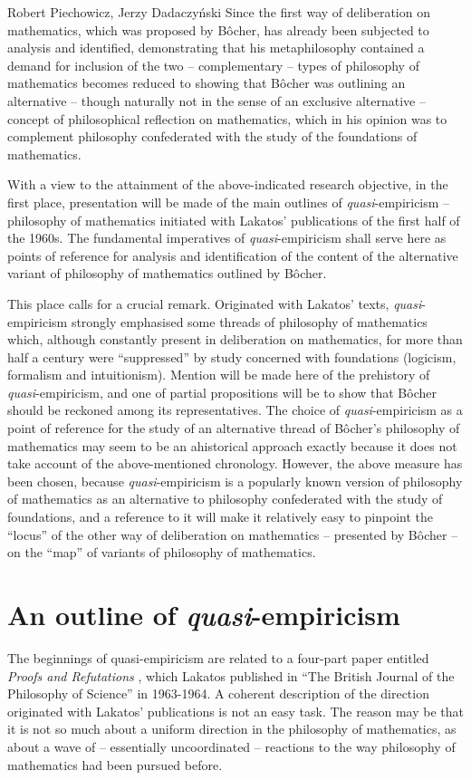 \begin{artengenv}{Robert Piechowicz, Jerzy Dadaczyński}
Since the first way of deliberation on mathematics, which was proposed by Bôcher, has already been subjected to analysis and identified, demonstrating that his metaphilosophy contained a demand for inclusion of the two -- complementary -- types of philosophy of mathematics becomes reduced to showing that Bôcher was outlining an alternative -- though naturally not in the sense of an exclusive alternative -- concept of philosophical reflection on mathematics, which in his opinion was to complement philosophy confederated with the study of the foundations of mathematics.

With a view to the attainment of the above-indicated research objective, in the first place, presentation will be made of the main outlines of \textit{quasi}-empiricism -- philosophy of mathematics initiated with Lakatos' publications of the first half of the 1960s. The fundamental imperatives of \textit{quasi}-empiricism shall serve here as points of reference for analysis and identification of the content of the alternative variant of philosophy of mathematics outlined by Bôcher.

This place calls for a crucial remark. Originated with Lakatos' texts, \textit{quasi}-empiricism strongly emphasised some threads of philosophy of mathematics which, although constantly present in deliberation on mathematics, for more than half a century were ``suppressed'' by study concerned with foundations (logicism, formalism and intuitionism). Mention will be made here of the prehistory of \textit{quasi}-empiricism, and one of partial propositions will be to show that Bôcher should be reckoned among its representatives. The choice of \textit{quasi}-empiricism as a point of reference for the study of an alternative thread of Bôcher's philosophy of mathematics may seem to be an ahistorical approach exactly because it does not take account of the above-mentioned chronology. However, the above measure has been chosen, because \textit{quasi}-empiricism is a popularly known version of philosophy of mathematics as an alternative to philosophy confederated with the study of foundations, and a reference to it will make it relatively easy to pinpoint the ``locus'' of the other way of deliberation on mathematics -- presented by Bôcher -- on the ``map'' of variants of philosophy of mathematics.

\section{An outline of \textit{quasi}-empiricism}
The beginnings of quasi-empiricism are related to a four-part paper entitled \textit{Proofs and Refutations}
\parencite[][]{lakatos_proofs_1963},
 which Lakatos published in ``The British Journal of the Philosophy of Science'' in 1963-1964. A coherent description of the direction originated with Lakatos' publications is not an easy task. The reason may be that it is not so much about a uniform direction in the philosophy of mathematics, as about a wave of -- essentially uncoordinated -- reactions to the way philosophy of mathematics had been pursued before.


\end{artengenv}
